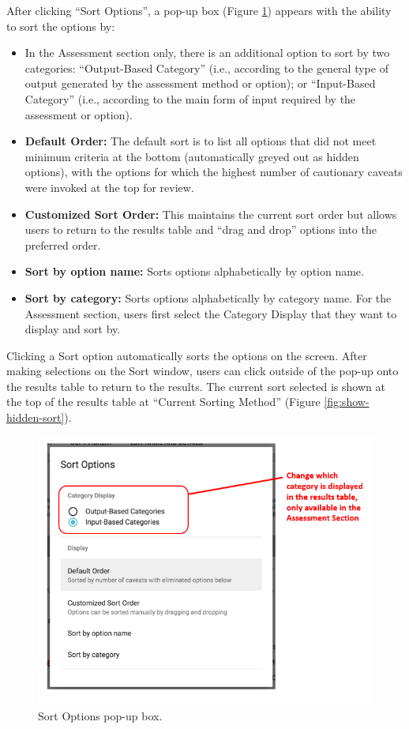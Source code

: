 \documentclass[
  11pt,
]{book}
\providecommand{\tightlist}{%
  \setlength{\itemsep}{0pt}\setlength{\parskip}{0pt}}
\begin{document}
After clicking ``Sort Options'', a pop-up box (Figure \ref{fig:filter-and-sorting}) appears with the ability to sort the options by:

\begin{itemize}
\tightlist
\item
  In the Assessment section only, there is an additional option to sort by two categories: ``Output-Based Category'' (i.e., according to the general type of output generated by the assessment method or option); or ``Input-Based Category'' (i.e., according to the main form of input required by the assessment or option).
\item
  \textbf{Default Order:} The default sort is to list all options that did not meet minimum criteria at the bottom (automatically greyed out as hidden options), with the options for which the highest number of cautionary caveats were invoked at the top for review.
\item
  \textbf{Customized Sort Order:} This maintains the current sort order but allows users to return to the results table and ``drag and drop'' options into the preferred order.
\item
  \textbf{Sort by option name:} Sorts options alphabetically by option name.
\item
  \textbf{Sort by category:} Sorts options alphabetically by category name. For the Assessment section, users first select the Category Display that they want to display and sort by.
\end{itemize}

Clicking a Sort option automatically sorts the options on the screen. After making selections on the Sort window, users can click outside of the pop-up onto the results table to return to the results.
The current sort selected is shown at the top of the results table at ``Current Sorting Method'' (Figure \ref{fig:show-hidden-sort}).

\begin{figure}

{\centering \includegraphics[width=0.5\linewidth]{images/filter-and-sorting-assessment} 

}

\caption{Sort Options pop-up box.}\label{fig:filter-and-sorting}
\end{figure}
\end{document}
